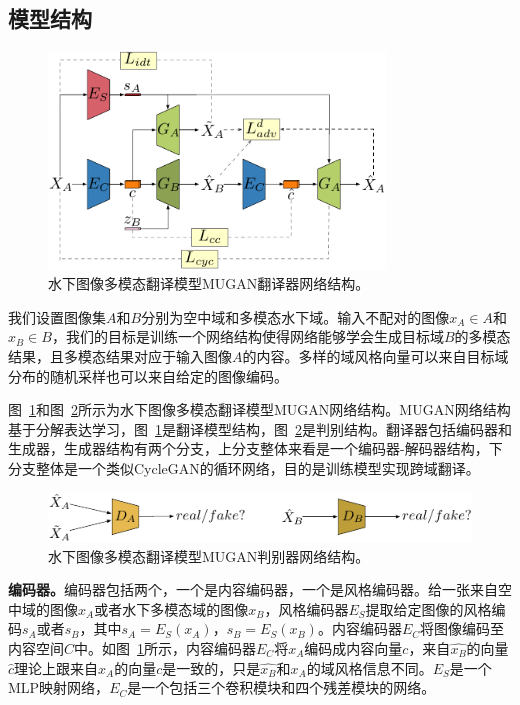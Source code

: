 \subsection{模型结构}

\begin{figure}[ht]
    \centering
    \includegraphics[width=0.8\textwidth]{figures/G.pdf}
    \caption{水下图像多模态翻译模型MUGAN翻译器网络结构。}
    \label{fig:mugan_g}
\end{figure}

我们设置图像集$A$和$B$分别为空中域和多模态水下域。输入不配对的图像$x_A \in A$和$x_B \in B$，我们的目标是训练一个网络结构使得网络能够学会生成目标域$B$的多模态结果，且多模态结果对应于输入图像$A$的内容。多样的域风格向量可以来自目标域分布的随机采样也可以来自给定的图像编码。

图~\ref{fig:mugan_g}和图~\ref{fig:mugan_d}所示为水下图像多模态翻译模型MUGAN网络结构。MUGAN网络结构基于分解表达学习，图~\ref{fig:mugan_g}是翻译模型结构，图~\ref{fig:mugan_d}是判别结构。翻译器包括编码器和生成器，生成器结构有两个分支，上分支整体来看是一个编码器-解码器结构，下分支整体是一个类似CycleGAN的循环网络，目的是训练模型实现跨域翻译。

\begin{figure}[ht]
    \centering
    \includegraphics[width=1\textwidth]{figures/D.pdf}
    \caption{水下图像多模态翻译模型MUGAN判别器网络结构。}
    \label{fig:mugan_d}
\end{figure}

\textbf{编码器。}编码器包括两个，一个是内容编码器，一个是风格编码器。给一张来自空中域的图像$x_A$或者水下多模态域的图像$x_B$，风格编码器$E_S$提取给定图像的风格编码$s_A$或者$s_B$，其中$s_A = E_S(x_A)$，$s_B = E_S(x_B)$。内容编码器$E_C$将图像编码至内容空间$C$中。如图~\ref{fig:mugan_g}所示，内容编码器$E_C$将$x_A$编码成内容向量$c$，来自$\hat{x_B}$的向量$\hat{c}$理论上跟来自$x_A$的向量$c$是一致的，只是$\hat{x_B}$和$x_A$的域风格信息不同。$E_S$是一个MLP映射网络，$E_C$是一个包括三个卷积模块和四个残差模块的网络。

